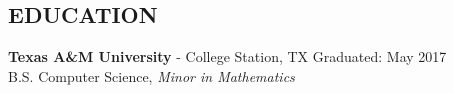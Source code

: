 \documentclass[resmargin,10pt]{res} %
\begin{document}
\begin{resume}
\section{EDUCATION}
{\bf Texas A\&M University} - College Station, TX \hfill
Graduated: May 2017 \\
B.S. Computer Science,
\textit{Minor in Mathematics}
\end{resume} 
\end{document}
